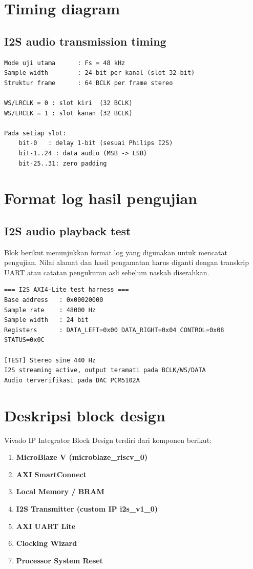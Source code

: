 \section{Timing diagram}

\subsection{I2S audio transmission timing}

\begin{verbatim}
Mode uji utama      : Fs = 48 kHz
Sample width        : 24-bit per kanal (slot 32-bit)
Struktur frame      : 64 BCLK per frame stereo

WS/LRCLK = 0 : slot kiri  (32 BCLK)
WS/LRCLK = 1 : slot kanan (32 BCLK)

Pada setiap slot:
	bit-0   : delay 1-bit (sesuai Philips I2S)
	bit-1..24 : data audio (MSB -> LSB)
	bit-25..31: zero padding
\end{verbatim}

\section{Format log hasil pengujian}

\subsection{I2S audio playback test}

Blok berikut menunjukkan format log yang digunakan untuk mencatat pengujian. Nilai alamat dan hasil pengamatan harus diganti dengan transkrip UART atau catatan pengukuran asli sebelum naskah diserahkan.

\begin{verbatim}
=== I2S AXI4-Lite test harness ===
Base address   : 0x00020000
Sample rate    : 48000 Hz
Sample width   : 24 bit
Registers      : DATA_LEFT=0x00 DATA_RIGHT=0x04 CONTROL=0x08 STATUS=0x0C

[TEST] Stereo sine 440 Hz
I2S streaming active, output teramati pada BCLK/WS/DATA
Audio terverifikasi pada DAC PCM5102A
\end{verbatim}

\section{Deskripsi block design}

Vivado IP Integrator Block Design terdiri dari komponen berikut:

\begin{enumerate}
\item \textbf{MicroBlaze V (microblaze\_riscv\_0)}
\item \textbf{AXI SmartConnect}
\item \textbf{Local Memory / BRAM}
\item \textbf{I2S Transmitter (custom IP i2s\_v1\_0)}
\item \textbf{AXI UART Lite}
\item \textbf{Clocking Wizard}
\item \textbf{Processor System Reset}
\end{enumerate}

